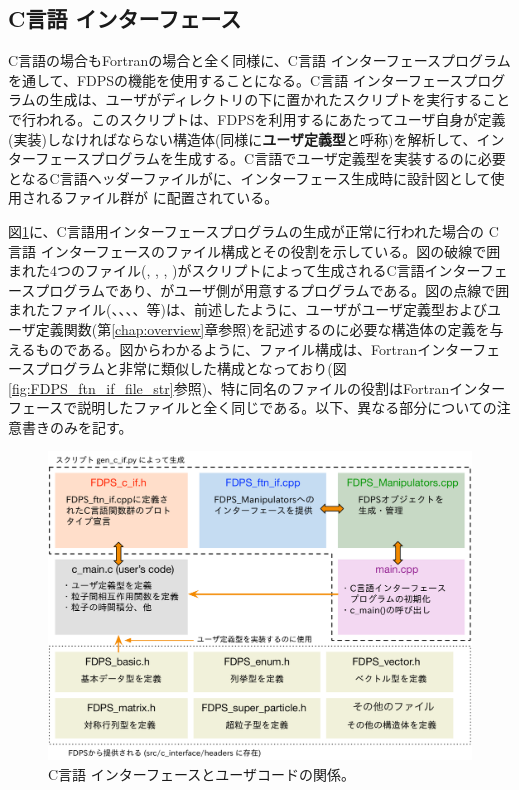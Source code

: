 \subsection{C言語 インターフェース}
\label{subsec:file_str_c_if}
C言語の場合もFortranの場合と全く同様に、C言語 インターフェースプログラムを通して、FDPSの機能を使用することになる。C言語 インターフェースプログラムの生成は、ユーザがディレクトリの下に置かれたスクリプトを実行することで行われる。このスクリプトは、FDPSを利用するにあたってユーザ自身が定義(実装)しなければならない構造体(同様に\textbf{ユーザ定義型}と呼称)を解析して、インターフェースプログラムを生成する。C言語でユーザ定義型を実装するのに必要となるC言語ヘッダーファイルがに、インターフェース生成時に設計図として使用されるファイル群が  に配置されている。

図\ref{fig:FDPS_c_if_file_str}に、C言語用インターフェースプログラムの生成が正常に行われた場合の C言語 インターフェースのファイル構成とその役割を示している。図の破線で囲まれた4つのファイル(, , , )がスクリプトによって生成されるC言語インターフェースプログラムであり、がユーザ側が用意するプログラムである。図の点線で囲まれたファイル(、、、、等)は、前述したように、ユーザがユーザ定義型およびユーザ定義関数(第\ref{chap:overview}章参照)を記述するのに必要な構造体の定義を与えるものである。図からわかるように、ファイル構成は、Fortranインターフェースプログラムと非常に類似した構成となっており(図\ref{fig:FDPS_ftn_if_file_str}参照)、特に同名のファイルの役割はFortranインターフェースで説明したファイルと全く同じである。以下、異なる部分についての注意書きのみを記す。


\begin{figure}[h]
\centering
\includegraphics[width=\linewidth]{./fig/FDPS_c_if_file_str.pdf}
\caption{C言語 インターフェースとユーザコードの関係。}
\label{fig:FDPS_c_if_file_str}
\end{figure}

